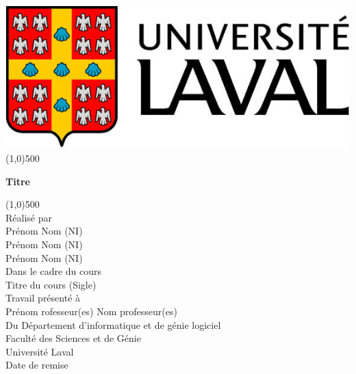 \begin{titlepage}
    \begin{center}
        \includegraphics[scale=1.5]{resources/icons/logo.jpg}\\
        {\color{black}\line(1,0){500}}\\
        [2mm]
        \begin{large}
            \textbf{Titre}\\ 
        \end{large}
         {\color{black}\line(1,0){500}}\\
        [1.5cm]
        Réalisé par\\
        Prénom Nom (NI)\\
        Prénom Nom (NI)\\
        Prénom Nom (NI)\\
        [4cm]
        Dans le cadre du cours\\
        Titre du cours (Sigle)\\ 
        [2.5cm]
        Travail présenté à\\
        Prénom rofesseur(es) Nom professeur(es)\\
        [4.5cm]
        Du Département d'informatique et de génie logiciel\\
        Faculté des Sciences et de Génie\\
        Université Laval\\
        Date de remise
    \end{center} 
\end{titlepage}